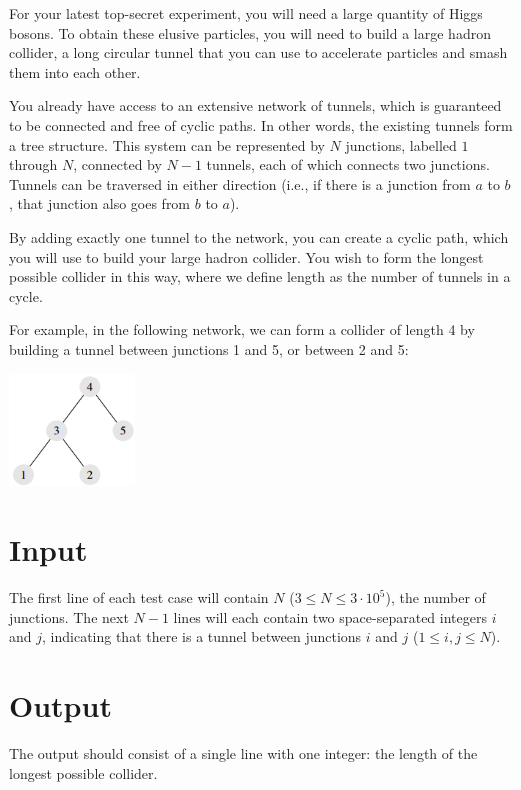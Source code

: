 
For your latest top-secret experiment, you will need a large quantity of Higgs
bosons. To obtain these elusive particles, you will need to build a large
hadron collider, a long circular tunnel that you can use to accelerate
particles and smash them into each other.

You already have access to an extensive network of tunnels, which is guaranteed
to be connected and free of cyclic paths. In other words, the existing tunnels
form a tree structure. This system can be represented by $N$ junctions, labelled
$1$ through $N$, connected by $N - 1$ tunnels, each of which connects two junctions.
Tunnels can be traversed in either direction (i.e., if there is a junction from
$a$ to $b$, that junction also goes from $b$ to $a$).

By adding exactly one tunnel to the network, you can create a cyclic path,
which you will use to build your large hadron collider. You wish to form the
longest possible collider in this way, where we define length as the number of
tunnels in a cycle.

For example, in the following network, we can form a collider of length 4 by
building a tunnel between junctions 1 and 5, or between 2 and 5:

\begin{center}
\includegraphics[width=0.25\textwidth]{ccc13s2p3}
\end{center}

\section*{Input}

The first line of each test case will contain $N$ ($3 \leq N \leq 3\cdot 10^5$), the number
of junctions. The next $N - 1$ lines will each contain two space-separated
integers $i$ and $j$, indicating that there is a tunnel between junctions $i$ and $j$ ($1 \leq i,j \leq N$).

\section*{Output}

The output should consist of a single line with one integer:
the length of the longest possible collider.

